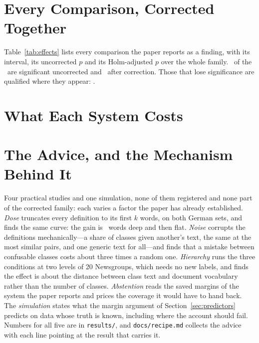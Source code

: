\documentclass[11pt]{article}
\begin{document}




\section{Every Comparison, Corrected Together}
\label{app:effects}

Table~\ref{tab:effects} lists every comparison the paper reports as a finding,
with its interval, its uncorrected $p$ and its Holm-adjusted $p$ over the whole
family. \EffectNominal\ of the \EffectTests\ are significant uncorrected and
\EffectHolm\ after correction. Those that lose significance are qualified where
they appear: \EffectLostList.



\section{What Each System Costs}
\label{app:cost}



\section{The Advice, and the Mechanism Behind It}
\label{app:practice}

Four practical studies and one simulation, none of them registered and none part
of the corrected family: each varies a factor the paper has already established.
\emph{Dose} truncates every definition to its first $k$ words, on both German
sets, and finds the same curve: the gain is \DoseNinetyWords\ words deep and
then flat. \emph{Noise} corrupts the definitions mechanically---a share of
classes given another's text, the same at the most similar pairs, and one generic
text for all---and finds that a mistake between confusable classes costs about
three times a random one. \emph{Hierarchy} runs the three conditions at two
levels of 20 Newsgroups, which needs no new labels, and finds the effect is about
the distance between class text and document vocabulary rather than the number of
classes. \emph{Abstention} reads the saved margins of the system the paper
reports and prices the coverage it would have to hand back. The
\emph{simulation} states what the margin argument of
Section~\ref{sec:predictors} predicts on data whose truth is known, including
where the account should fail. Numbers for all five are in
\texttt{results/}, and \texttt{docs/recipe.md} collects the advice with each
line pointing at the result that carries it.
\end{document}
